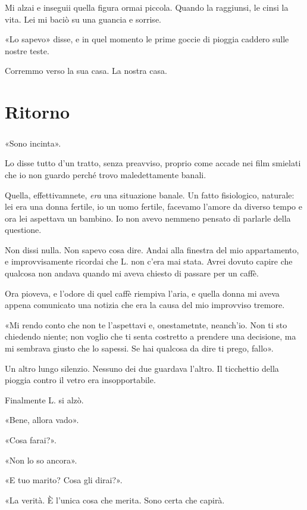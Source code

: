 \documentclass[a4paper,12pt]{book}
\begin{document}
Mi alzai e inseguii quella figura ormai piccola. Quando la raggiunsi, le
cinsi la vita. Lei mi baciò su una guancia e sorrise.

«Lo sapevo» disse, e in quel momento le prime goccie di pioggia caddero sulle
nostre teste.

Corremmo verso la sua casa. La nostra casa.

\chapter{Ritorno}

\paragraph{}
«Sono incinta».

Lo disse tutto d'un tratto, senza preavviso, proprio come accade nei film
smielati che io non guardo perché trovo maledettamente banali.

Quella, effettivamnete, \emph{era} una situazione banale. Un fatto fisiologico,
naturale: lei era una donna fertile, io un uomo fertile, facevamo l'amore da
diverso tempo e ora lei aspettava un bambino. Io non avevo nemmeno pensato di
parlarle della questione.

Non dissi nulla. Non sapevo cosa dire. Andai alla finestra del mio appartamento,
e improvvisamente ricordai che L. non c'era mai stata. Avrei dovuto capire che
qualcosa non andava quando mi aveva chiesto di passare per un caffè.

Ora pioveva, e l'odore di quel caffè riempiva l'aria, e quella donna mi aveva
appena comunicato una notizia che era la causa del mio improvviso tremore.

«Mi rendo conto che non te l'aspettavi e, onestametnte, neanch'io. Non ti sto
chiedendo niente; non voglio che ti senta costretto a prendere una decisione,
ma mi sembrava giusto che lo sapessi. Se hai qualcosa da dire ti prego, fallo».

Un altro lungo silenzio. Nessuno dei due guardava l'altro. Il ticchettio della
pioggia contro il vetro era insopportabile.

Finalmente L. si alzò.

«Bene, allora vado».

«Cosa farai?».

«Non lo so ancora».

«E tuo marito? Cosa gli dirai?».

«La verità. È l'unica cosa che merita. Sono certa che capirà.
\end{document}
